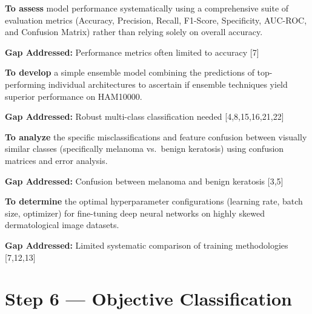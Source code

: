 \documentclass[11pt,a4paper]{article}
\begin{document}
\begin{objectivebox}
\textbf{To assess} model performance systematically using a comprehensive suite of evaluation metrics (Accuracy, Precision, Recall, F1-Score, Specificity, AUC-ROC, and Confusion Matrix) rather than relying solely on overall accuracy.

\smallskip
\textbf{Gap Addressed:} Performance metrics often limited to accuracy [7]
\end{objectivebox}

\begin{objectivebox}
\textbf{To develop} a simple ensemble model combining the predictions of top-performing individual architectures to ascertain if ensemble techniques yield superior performance on HAM10000.

\smallskip
\textbf{Gap Addressed:} Robust multi-class classification needed [4,8,15,16,21,22]
\end{objectivebox}

\begin{objectivebox}
\textbf{To analyze} the specific misclassifications and feature confusion between visually similar classes (specifically melanoma vs.\ benign keratosis) using confusion matrices and error analysis.

\smallskip
\textbf{Gap Addressed:} Confusion between melanoma and benign keratosis [3,5]
\end{objectivebox}

\begin{objectivebox}
\textbf{To determine} the optimal hyperparameter configurations (learning rate, batch size, optimizer) for fine-tuning deep neural networks on highly skewed dermatological image datasets.

\smallskip
\textbf{Gap Addressed:} Limited systematic comparison of training methodologies [7,12,13]
\end{objectivebox}

\newpage

\section{Step 6 --- Objective Classification}
\label{sec:step6}
\end{document}
